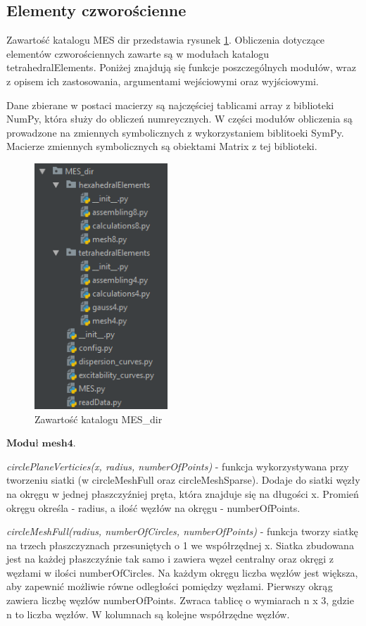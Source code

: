 
\subsection{Elementy czworościenne}
\label{cha:elementy czworościenne}

Zawartość katalogu MES dir przedstawia rysunek \ref{fig:okno_projektu_MES}. Obliczenia dotyczące elementów czworościennych zawarte są w modułach katalogu tetrahedralElements. Poniżej znajdują się funkcje poszczególnych modułów, wraz z opisem ich zastosowania, argumentami wejściowymi oraz wyjściowymi.

Dane zbierane w postaci macierzy są najczęściej tablicami array z biblioteki NumPy, która służy do obliczeń numreycznych. W części modułów obliczenia są prowadzone na zmiennych symbolicznych z wykorzystaniem biblitoeki SymPy. Macierze zmiennych symbolicznych są obiektami Matrix z tej biblioteki.

\begin{figure}[h]
\centering
\includegraphics[width=5cm]{Zdjecia/5/okno_projektu_MES}
\caption{Zawartość katalogu MES\_dir}
\label{fig:okno_projektu_MES}
\end{figure}

\vspace {3mm}
 \( \textbf{Moduł mesh4} \).

\vspace {3mm}
\textit{circlePlaneVerticies(x, radius, numberOfPoints)} - funkcja wykorzystywana przy tworzeniu siatki (w circleMeshFull oraz circleMeshSparse). Dodaje do siatki węzły na okręgu w jednej płaszczyźniej pręta, która znajduje się na długości x. Promień okręgu określa - radius, a ilość węzłów na okręgu - numberOfPoints.

\vspace {3mm}
\textit{circleMeshFull(radius, numberOfCircles, numberOfPoints)} - funkcja tworzy siatkę na trzech płaszczyznach przesuniętych o 1 we współrzędnej x. Siatka zbudowana jest na każdej płaszczyźnie tak samo i zawiera węzeł centralny oraz okręgi z węzłami w ilości numberOfCircles. Na każdym okręgu liczba węzłów jest większa, aby zapewnić możliwie równe odległości pomiędzy węzłami. Pierwszy okrąg zawiera liczbę węzłów numberOfPoints. Zwraca tablicę o wymiarach n x 3, gdzie n to liczba węzłów. W kolumnach są kolejne współrzędne węzłów.

